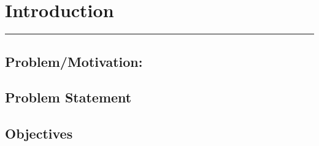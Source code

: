 \chapter{Introduction}
\noindent \rule{6.6in}{0.01in}
\newpage 



\section{Problem/Motivation:}

 

\section{Problem Statement}



\section{Objectives}


